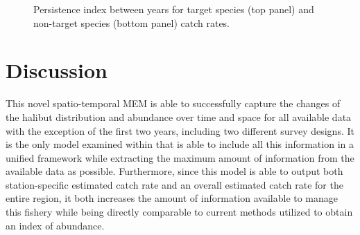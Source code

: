 \documentclass[12pt]{article}\usepackage[]{graphicx}\usepackage[]{color}
\begin{document}
\begin{figure}[htb]

{\centering {}  

}

\caption{Persistence index between years for target species (top panel) and non-target species (bottom panel) catch rates.}\label{fig:persist}
\end{figure}
\hypertarget{discussion}{%
\section{Discussion}\label{discussion}}

This novel spatio-temporal MEM is able to successfully capture the changes of the halibut distribution and abundance over time and space for all available data with the exception of the first two years, including two different survey designs. It is the only model examined within that is able to include all this information in a unified framework while extracting the maximum amount of information from the available data as possible. Furthermore, since this model is able to output both station-specific estimated catch rate and an overall estimated catch rate for the entire region, it both increases the amount of information available to manage this fishery while being directly comparable to current methods utilized to obtain an index of abundance.
\end{document}
